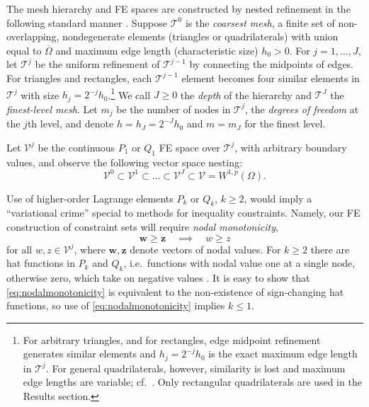 \documentclass[letterpaper,final,12pt,reqno]{amsart}
\theoremstyle{cstyle}
\theoremstyle{cstyle*}
\theoremstyle{dstyle}
\numberwithin{equation}{section}
\numberwithin{figure}{section}
\numberwithin{table}{section}
\numberwithin{theorem}{section}
\newcommand{\bw}{\mathbf{w}}
\newcommand{\bz}{\mathbf{z}}
\begin{document}
The mesh hierarchy and FE spaces are constructed by nested refinement in the following standard manner \cite{Elmanetal2014}.  Suppose $\mathcal{T}^0$ is the \emph{coarsest mesh}, a finite set of non-overlapping, nondegenerate elements (triangles or quadrilaterals) with union equal to $\overline{\Omega}$ and maximum edge length (characteristic size) $h_0>0$.  For $j=1,\dots,J$, let $\mathcal{T}^j$ be the uniform refinement of $\mathcal{T}^{j-1}$ by connecting the midpoints of edges.  For triangles and rectangles, each $\mathcal{T}^{j-1}$ element becomes four similar elements in $\mathcal{T}^j$ with size $h_j = 2^{-j} h_0$.\footnote{For arbitrary triangles, and for rectangles, edge midpoint refinement generates similar elements and $h_j=2^{-j}h_0$ is the exact maximum edge length in $\mathcal{T}^j$.  For general quadrilaterals, however, similarity is lost and maximum edge lengths are variable; cf.~\cite{Zhang2004}.  Only rectangular quadrilaterals are used in the Results section.}  We call $J\ge 0$ the \emph{depth} of the hierarchy and $\mathcal{T}^J$ the \emph{finest-level mesh}.  Let $m_j$ be the number of nodes in $\mathcal{T}^j$, the \emph{degrees of freedom} at the $j$th level, and denote $h=h_J=2^{-J} h_0$ and $m=m_J$ for the finest level.

Let $\mathcal{V}^j$ be the continuous $P_1$ or $Q_1$ FE space \cite{Elmanetal2014} over $\mathcal{T}^j$, with arbitrary boundary values, and observe the following vector space nesting:
\begin{equation}
\mathcal{V}^0 \subset \mathcal{V}^1 \subset \dots \subset \mathcal{V}^J \subset \mathcal{V}=W^{1,p}(\Omega).  \label{eq:fe:nestedspaces}
\end{equation}

Use of higher-order Lagrange elements $P_k$ or $Q_k$, $k\ge 2$, would imply a ``variational crime'' \cite[Chapter 10]{BrennerScott2007} special to methods for inequality constraints.  Namely, our FE construction of constraint sets will require \emph{nodal monotonicity},
\begin{equation}
\bw \ge \bz \quad \implies \quad w \ge z \label{eq:nodalmonotonicity}
\end{equation}
for all $w,z \in \mathcal{V}^j$, where $\bw,\bz$ denote vectors of nodal values.  For $k\ge 2$ there are hat functions in $P_k$ and $Q_k$, i.e.~functions with nodal value one at a single node, otherwise zero, which take on negative values \cite[Figure 1.7]{Elmanetal2014}.  It is easy to show that \eqref{eq:nodalmonotonicity} is equivalent to the non-existence of sign-changing hat functions, so use of \eqref{eq:nodalmonotonicity} implies $k\le 1$.
\end{document}
